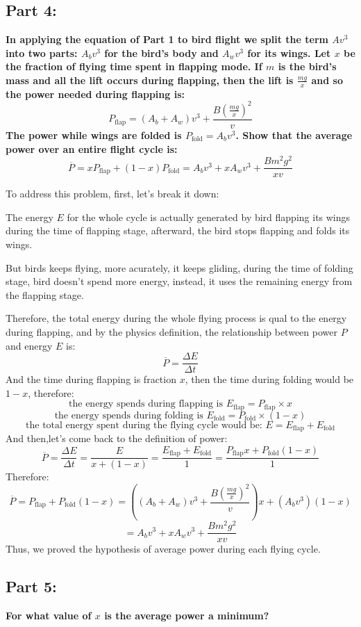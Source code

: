 \documentclass{article}
\begin{document}
\subsection*{Part 4:}
\label{sec:part4}
{\large \bfseries In applying the equation of Part 1 to bird flight we split the term \(Av^3\)into two
parts: \(A_bv^3\) for the bird’s body and \(A_wv^3\) for its wings. Let \(x\) be the fraction of flying time spent in flapping mode. If \(m\) is the bird’s mass and all the lift occurs during flapping, then the lift is \(\frac{mg}{x}\) and so the power needed during flapping is:
\[P_\text{flap} = (A_b+A_w)v^3+\frac{B(\frac{mg}{x})^2}{v}\]
The power while wings are folded is \(P_\text{fold}=A_bv^3\). Show that the average power over an entire flight cycle is:
\[\overline{P}=xP_\text{flap}+(1-x)P_\text{fold} = A_bv^3+xA_wv^3+\frac{Bm^2g^2}{xv}\]}

To address this problem, first, let's break it down:

 The energy \(E\) for the whole cycle is actually generated by bird flapping its wings during the time of flapping stage, afterward, the bird stops flapping and folds its wings.

 But birds keeps flying, more acurately, it keeps gliding, during the time of folding stage, bird doesn't spend more energy, instead, it uses the remaining energy from the flapping stage.

Therefore, the total energy during the whole flying process is qual to the energy during flapping, and by the physics definition, the relationship between power \(P\) and energy \(E\) is:
\[\overline{P}=\frac{\Delta E}{\Delta t}\]
And the time during flapping is fraction \(x\), then the time during folding would be \(1-x\), therefore:
\[\text{the energy spends during flapping is } E_\text{flap} =P_\text{flap}\times  x \]
\[\text{the energy spends during folding is } E_\text{fold} = P_\text{fold}\times (1-x)\] 
\[\text{the total energy spent during the flying cycle would be: }E = E_\text{flap} +E_\text{fold} \]
And then,let's come back to the definition of power:
 \[\overline{P}=\frac{\Delta E}{\Delta t}=\frac{E}{x+(1-x)}=\frac{E_\text{flap}+E_\text{fold}}{1}=\frac{P_\text{flap}x + P_\text{fold}(1-x)}{1}\]
 Therefore:
\[\overline{P}=P_\text{flap}+P_\text{fold}(1-x)=((A_b+A_w)v^3+\frac{B(\frac{mg}{x})^2}{v})x+(A_bv^3)(1-x)\] 
\[= A_bv^3+xA_wv^3+\frac{Bm^2g^2}{xv}\]
Thus, we proved the hypothesis of average power during each flying cycle.


\subsection*{Part 5:}
{\large \bfseries For what value of \(x\) is the average power a minimum?
}\setlength{\parskip}{1em}
\end{document}

